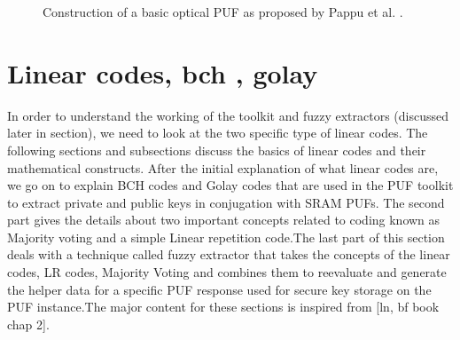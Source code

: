 \begin{figure}
\centering
{}
\caption{Construction of a basic optical PUF as proposed by Pappu et al. \cite{18,19}.}
\label{img:3}
\end{figure}

\section{Linear codes, bch , golay}
In order to understand the working of the toolkit and fuzzy extractors (discussed later in section), we need to look at the two specific type of linear codes. The following sections and subsections discuss the basics of linear codes and their mathematical constructs. After the initial explanation of what linear codes are, we go on to explain BCH codes and Golay codes that are used in the PUF toolkit to extract private and public keys in conjugation with SRAM PUFs. The second part
gives the details about two important concepts related to coding known as Majority voting and a simple Linear repetition code.The last part of
this section deals with a technique called fuzzy extractor that takes the concepts of the linear codes, LR codes, Majority Voting and combines them to reevaluate and generate the helper data for a specific PUF response used for secure key storage on the PUF instance.The major
content for these sections is inspired from [ln, bf book chap 2].\\

